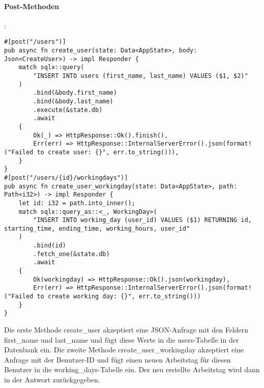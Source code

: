 \paragraph{Post-Methoden}:
\begin{verbatim}
#[post("/users")]
pub async fn create_user(state: Data<AppState>, body: Json<CreateUser>) -> impl Responder {
    match sqlx::query(
        "INSERT INTO users (first_name, last_name) VALUES ($1, $2)"
    )
        .bind(&body.first_name)
        .bind(&body.last_name)
        .execute(&state.db)
        .await
    {
        Ok(_) => HttpResponse::Ok().finish(),
        Err(err) => HttpResponse::InternalServerError().json(format!("Failed to create user: {}", err.to_string())),
    }
}
#[post("/users/{id}/workingdays")]
pub async fn create_user_workingday(state: Data<AppState>, path: Path<i32>) -> impl Responder {
    let id: i32 = path.into_inner();
    match sqlx::query_as::<_, WorkingDay>(
        "INSERT INTO working_day (user_id) VALUES ($1) RETURNING id, starting_time, ending_time, working_hours, user_id"
    )
        .bind(id)
        .fetch_one(&state.db)
        .await
    {
        Ok(workingday) => HttpResponse::Ok().json(workingday),
        Err(err) => HttpResponse::InternalServerError().json(format!("Failed to create working day: {}", err.to_string()))
    }
}
\end{verbatim}
Die erste Methode create\_user akzeptiert eine JSON-Anfrage mit den Feldern first\_name und last\_name und fügt diese Werte in die users-Tabelle in der Datenbank ein. Die zweite Methode create\_user\_workingday akzeptiert eine Anfrage mit der Benutzer-ID und fügt einen neuen Arbeitstag für diesen Benutzer in die working\_days-Tabelle ein. Der neu erstellte Arbeitstag wird dann in der Antwort zurückgegeben.

